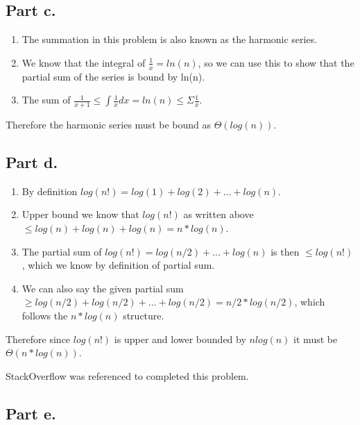 \documentclass[]{article}
\providecommand{\tightlist}{%
  \setlength{\itemsep}{0pt}\setlength{\parskip}{0pt}}
\begin{document}
\pagebreak

\subsection{Part c.}\label{part-c.}

\begin{enumerate}
\def\labelenumi{\arabic{enumi}.}
\tightlist
\item
  The summation in this problem is also known as the harmonic series.
\item
  We know that the integral of \(\frac1{x} = ln(n)\), so we can use this
  to show that the partial sum of the series is bound by ln(n).
\item
  The sum of
  \(\frac{1}{x+1} \leq \int\frac1{x}dx = ln(n) \leq \Sigma \frac1{x}\).
\end{enumerate}

Therefore the harmonic series must be bound as \(\Theta(log(n))\).

\pagebreak

\subsection{Part d.}\label{part-d.-1}

\begin{enumerate}
\def\labelenumi{\arabic{enumi}.}
\tightlist
\item
  By definition \(log(n!) = log(1) + log(2) + ... + log(n)\).
\item
  Upper bound we know that \(log(n!)\) as written above
  \(\leq log(n) + log(n) + log(n) = n*log(n)\).
\item
  The partial sum of \(log(n!) = log(n/2) + ... + log(n)\) is then
  \(\leq log(n!)\), which we know by definition of partial sum.
\item
  We can also say the given partial sum
  \(\geq log(n/2) + log(n/2) + ... + log(n/2) = n/2 * log(n/2)\), which
  follows the \(n * log(n)\) structure.
\end{enumerate}

Therefore since \(log(n!)\) is upper and lower bounded by \(nlog(n)\) it
must be \(\Theta(n*log(n))\).

StackOverflow was referenced to completed this problem.

\pagebreak

\subsection{Part e.}\label{part-e.}
\end{document}
